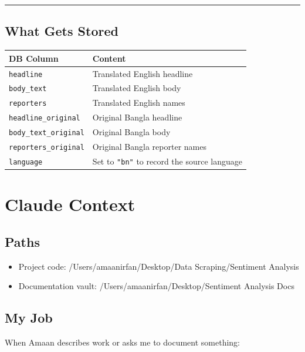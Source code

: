 \documentclass[
]{article}
\newcounter{none} %
\providecommand{\tightlist}{%
  \setlength{\itemsep}{0pt}\setlength{\parskip}{0pt}}
\begin{document}
\begin{center}\rule{0.5\linewidth}{0.5pt}\end{center}

\subsection{What Gets Stored}\label{what-gets-stored}

{\def\LTcaptype{none} %
\begin{longtable}[]{@{}ll@{}}
\toprule\noalign{}
DB Column & Content \\
\midrule\noalign{}
\endhead
\bottomrule\noalign{}
\endlastfoot
\texttt{headline} & Translated English headline \\
\texttt{body\_text} & Translated English body \\
\texttt{reporters} & Translated English names \\
\texttt{headline\_original} & Original Bangla headline \\
\texttt{body\_text\_original} & Original Bangla body \\
\texttt{reporters\_original} & Original Bangla reporter names \\
\texttt{language} & Set to \texttt{"bn"} to record the source
language \\
\end{longtable}
}

\section{Claude Context}\label{claude-context}

\subsection{Paths}\label{paths}

\begin{itemize}
\tightlist
\item
  Project code: /Users/amaanirfan/Desktop/Data Scraping/Sentiment
  Analysis
\item
  Documentation vault: /Users/amaanirfan/Desktop/Sentiment Analysis Docs
\end{itemize}

\subsection{My Job}\label{my-job}

When Amaan describes work or asks me to document something:
\end{document}
